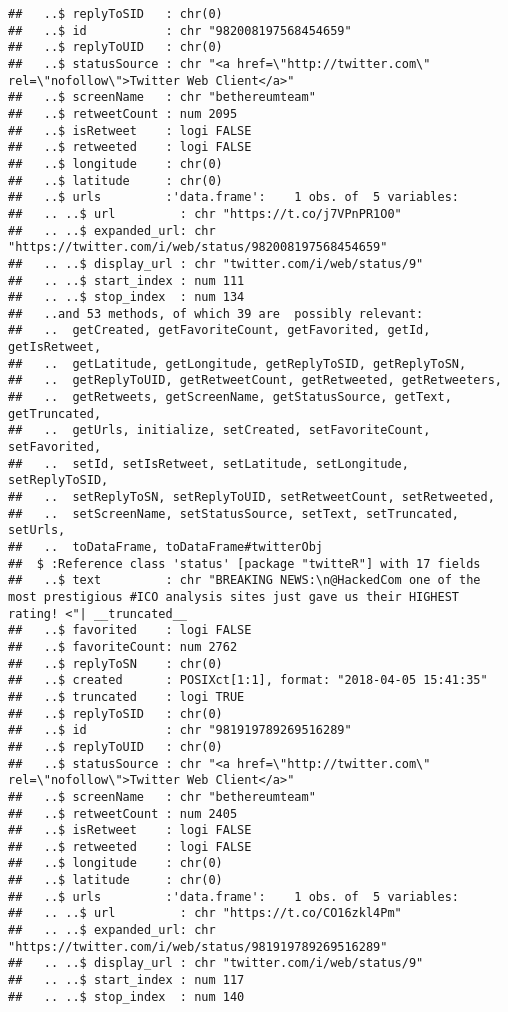 \documentclass[]{article}
\begin{document}
\begin{verbatim}
##   ..$ replyToSID   : chr(0) 
##   ..$ id           : chr "982008197568454659"
##   ..$ replyToUID   : chr(0) 
##   ..$ statusSource : chr "<a href=\"http://twitter.com\" rel=\"nofollow\">Twitter Web Client</a>"
##   ..$ screenName   : chr "bethereumteam"
##   ..$ retweetCount : num 2095
##   ..$ isRetweet    : logi FALSE
##   ..$ retweeted    : logi FALSE
##   ..$ longitude    : chr(0) 
##   ..$ latitude     : chr(0) 
##   ..$ urls         :'data.frame':    1 obs. of  5 variables:
##   .. ..$ url         : chr "https://t.co/j7VPnPR1O0"
##   .. ..$ expanded_url: chr "https://twitter.com/i/web/status/982008197568454659"
##   .. ..$ display_url : chr "twitter.com/i/web/status/9"
##   .. ..$ start_index : num 111
##   .. ..$ stop_index  : num 134
##   ..and 53 methods, of which 39 are  possibly relevant:
##   ..  getCreated, getFavoriteCount, getFavorited, getId, getIsRetweet,
##   ..  getLatitude, getLongitude, getReplyToSID, getReplyToSN,
##   ..  getReplyToUID, getRetweetCount, getRetweeted, getRetweeters,
##   ..  getRetweets, getScreenName, getStatusSource, getText, getTruncated,
##   ..  getUrls, initialize, setCreated, setFavoriteCount, setFavorited,
##   ..  setId, setIsRetweet, setLatitude, setLongitude, setReplyToSID,
##   ..  setReplyToSN, setReplyToUID, setRetweetCount, setRetweeted,
##   ..  setScreenName, setStatusSource, setText, setTruncated, setUrls,
##   ..  toDataFrame, toDataFrame#twitterObj
##  $ :Reference class 'status' [package "twitteR"] with 17 fields
##   ..$ text         : chr "BREAKING NEWS:\n@HackedCom one of the most prestigious #ICO analysis sites just gave us their HIGHEST rating! <"| __truncated__
##   ..$ favorited    : logi FALSE
##   ..$ favoriteCount: num 2762
##   ..$ replyToSN    : chr(0) 
##   ..$ created      : POSIXct[1:1], format: "2018-04-05 15:41:35"
##   ..$ truncated    : logi TRUE
##   ..$ replyToSID   : chr(0) 
##   ..$ id           : chr "981919789269516289"
##   ..$ replyToUID   : chr(0) 
##   ..$ statusSource : chr "<a href=\"http://twitter.com\" rel=\"nofollow\">Twitter Web Client</a>"
##   ..$ screenName   : chr "bethereumteam"
##   ..$ retweetCount : num 2405
##   ..$ isRetweet    : logi FALSE
##   ..$ retweeted    : logi FALSE
##   ..$ longitude    : chr(0) 
##   ..$ latitude     : chr(0) 
##   ..$ urls         :'data.frame':    1 obs. of  5 variables:
##   .. ..$ url         : chr "https://t.co/CO16zkl4Pm"
##   .. ..$ expanded_url: chr "https://twitter.com/i/web/status/981919789269516289"
##   .. ..$ display_url : chr "twitter.com/i/web/status/9"
##   .. ..$ start_index : num 117
##   .. ..$ stop_index  : num 140

\end{verbatim}
\end{document}
